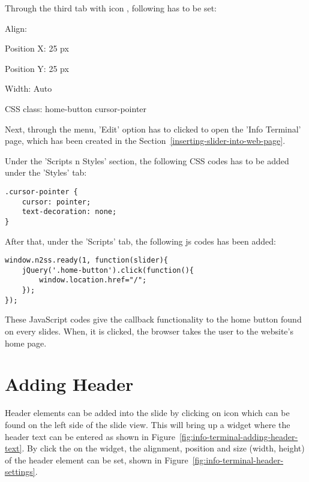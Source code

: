 Through the third tab with icon , following has to be set:
\begin{itemize*}
\item Align: 
\item Position X: 25 px
\item Position Y: 25 px
\item Width: Auto
\item CSS class: home-button cursor-pointer
\end{itemize*}

Next, through the  menu, 'Edit' option has to clicked to open the 'Info Terminal' page, which has been created in the Section~\ref{inserting-slider-into-web-page}.

Under the 'Scripts n Styles' section, the following CSS codes has to be added under the 'Styles' tab:
\begin{lstlisting}
.cursor-pointer {
	cursor: pointer;
	text-decoration: none;
}
\end{lstlisting}

After that, under the 'Scripts' tab, the following \ac{js} codes has been added:
\begin{lstlisting}
window.n2ss.ready(1, function(slider){
	jQuery('.home-button').click(function(){
		window.location.href="/";
	});
});
\end{lstlisting}

These JavaScript codes give the callback functionality to the home button found on every slides. When, it is clicked, the browser takes the user to the website's home page.

\section{Adding Header} \label{sec:adding-header}
Header elements can be added into the slide by clicking on  icon which can be found on the left side of the slide view. This will bring up a widget where the header text can be entered as shown in Figure~\ref{fig:info-terminal-adding-header-text}. By click the  on the widget, the alignment, position and size (width, height) of the header element can be set, shown in Figure~\ref{fig:info-terminal-header-settings}.

